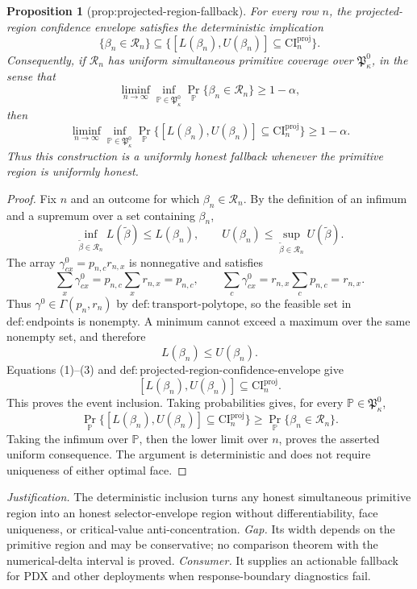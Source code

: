 \documentclass{article}
\newtheorem{proposition}{Proposition}
\begin{document}
\begin{proposition}[prop:projected-region-fallback]\label{prop:projected-region-fallback}
For every row \(n\), the projected-region confidence envelope satisfies the deterministic implication
\[
\{\beta_n\in\mathcal R_n\}
\subseteq
\{[L(\beta_n),U(\beta_n)]\subseteq\mathrm{CI}_n^{\mathrm{proj}}\}.
\]
Consequently, if \(\mathcal R_n\) has uniform simultaneous primitive coverage over \(\mathfrak P_{\kappa}^{0}\), in the sense that
\[
\liminf_{n\to\infty}\inf_{\mathbb P\in\mathfrak P_{\kappa}^{0}}
\Pr_{\mathbb P}\{\beta_n\in\mathcal R_n\}\geq1-\alpha,
\]
then
\[
\liminf_{n\to\infty}\inf_{\mathbb P\in\mathfrak P_{\kappa}^{0}}
\Pr_{\mathbb P}\{[L(\beta_n),U(\beta_n)]\subseteq\mathrm{CI}_n^{\mathrm{proj}}\}
\geq1-\alpha.
\]
Thus this construction is a uniformly honest fallback whenever the primitive region is uniformly honest.
\end{proposition}
\begin{proof}
Fix \(n\) and an outcome for which \(\beta_n\in\mathcal R_n\).  By the definition of an infimum and a supremum over a set containing \(\beta_n\),
\[
\inf_{\widetilde\beta\in\mathcal R_n}L(\widetilde\beta)
\leq L(\beta_n),
\qquad
U(\beta_n)
\leq\sup_{\widetilde\beta\in\mathcal R_n}U(\widetilde\beta).
\tag{1}
\]
The array \(\gamma^0_{cx}=p_{n,c}r_{n,x}\) is nonnegative and satisfies
\[
\sum_x\gamma^0_{cx}=p_{n,c}\sum_xr_{n,x}=p_{n,c},
\qquad
\sum_c\gamma^0_{cx}=r_{n,x}\sum_cp_{n,c}=r_{n,x}.
\tag{2}
\]
Thus \(\gamma^0\in\Gamma(p_n,r_n)\) by \(\mathrm{def:transport\text{-}polytope}\), so the feasible set in \(\mathrm{def:endpoints}\) is nonempty.  A minimum cannot exceed a maximum over the same nonempty set, and therefore
\[
L(\beta_n)\leq U(\beta_n).
\tag{3}
\]
Equations (1)--(3) and \(\mathrm{def:projected\text{-}region\text{-}confidence\text{-}envelope}\) give
\[
[L(\beta_n),U(\beta_n)]
\subseteq\mathrm{CI}_n^{\mathrm{proj}}.
\tag{4}
\]
This proves the event inclusion.  Taking probabilities gives, for every \(\mathbb P\in\mathfrak P_{\kappa}^{0}\),
\[
\Pr_{\mathbb P}\{[L(\beta_n),U(\beta_n)]\subseteq\mathrm{CI}_n^{\mathrm{proj}}\}
\geq
\Pr_{\mathbb P}\{\beta_n\in\mathcal R_n\}.
\tag{5}
\]
Taking the infimum over \(\mathbb P\), then the lower limit over \(n\), proves the asserted uniform consequence.  The argument is deterministic and does not require uniqueness of either optimal face.
\end{proof}
\par\smallskip\noindent \textit{Justification.} The deterministic inclusion turns any honest simultaneous primitive region into an honest selector-envelope region without differentiability, face uniqueness, or critical-value anti-concentration. \textit{Gap.} Its width depends on the primitive region and may be conservative; no comparison theorem with the numerical-delta interval is proved. \textit{Consumer.} It supplies an actionable fallback for PDX and other deployments when response-boundary diagnostics fail.
\end{document}
